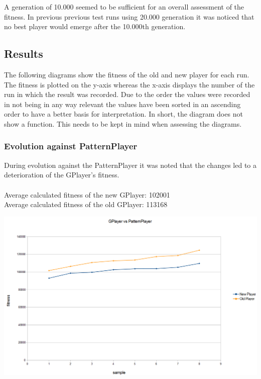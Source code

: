 \documentclass[12pt,fleqn,a4paper]{article}
\begin{document}
A generation of 10.000 seemed to be sufficient for an overall assessment of the fitness. In previous previous test runs using 20.000 generation it was noticed that no best player would emerge after the 10.000th generation.

\subsection{Results}
The following diagrams show the fitness of the old and new player for each run. \\
The fitness is plotted on the y-axis whereas the x-axis displays the number of the run in which the result was recorded. Due to the order the values were recorded in not being in any way relevant the values have been sorted in an ascending order to have a better basis for interpretation. In short, the diagram does not show a function. This needs to be kept in mind when assessing the diagrams.
\subsubsection{Evolution against PatternPlayer}
During evolution against the PatternPlayer it was noted that the changes led to a deterioration of the GPlayer's fitness.\\
\\
Average calculated fitness of the new GPlayer: 102001\\
Average calculated fitness of the old GPlayer: 113168
\begin{center}
	\includegraphics[width=.9\textwidth]{gp_vs_pp_1.png}
\end{center}
\end{document}
